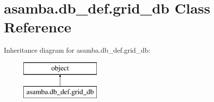 \hypertarget{classasamba_1_1db__def_1_1grid__db}{}\section{asamba.\+db\+\_\+def.\+grid\+\_\+db Class Reference}
\label{classasamba_1_1db__def_1_1grid__db}
Inheritance diagram for asamba.\+db\+\_\+def.\+grid\+\_\+db\+:\begin{figure}[H]
\begin{center}
\leavevmode
\includegraphics[height=2.000000cm]{classasamba_1_1db__def_1_1grid__db}
\end{center}
\end{figure}
